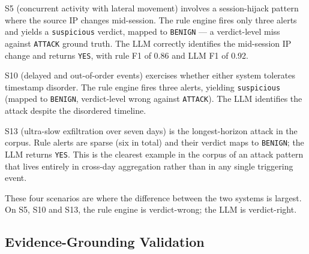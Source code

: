 \documentclass[conference]{IEEEtran}
\begin{document}
S5 (concurrent activity with lateral movement) involves a session-hijack pattern where the source IP changes mid-session. The rule engine fires only three alerts and yields a \texttt{suspicious} verdict, mapped to \texttt{BENIGN} --- a verdict-level miss against \texttt{ATTACK} ground truth. The LLM correctly identifies the mid-session IP change and returns \texttt{YES}, with rule F1 of 0.86 and LLM F1 of 0.92.

S10 (delayed and out-of-order events) exercises whether either system tolerates timestamp disorder. The rule engine fires three alerts, yielding \texttt{suspicious} (mapped to \texttt{BENIGN}, verdict-level wrong against \texttt{ATTACK}). The LLM identifies the attack despite the disordered timeline.

S13 (ultra-slow exfiltration over seven days) is the longest-horizon attack in the corpus. Rule alerts are sparse (six in total) and their verdict maps to \texttt{BENIGN}; the LLM returns \texttt{YES}. This is the clearest example in the corpus of an attack pattern that lives entirely in cross-day aggregation rather than in any single triggering event.

These four scenarios are where the difference between the two systems is largest. On S5, S10 and S13, the rule engine is verdict-wrong; the LLM is verdict-right.

\subsection{Evidence-Grounding Validation}
\label{sec:grounding}
\end{document}
